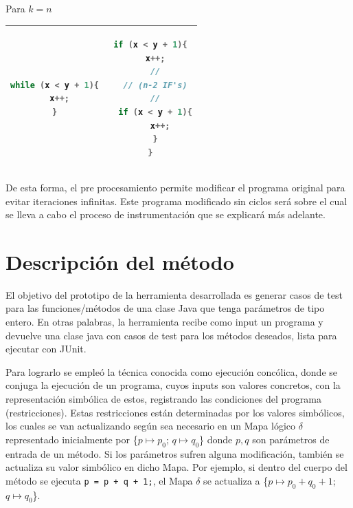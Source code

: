 \documentclass{llncs}
\begin{document}
Para \(k = n\)
\begin{table}
\centering
\begin{tabular}{|c | c|}
\hline
\begin{lstlisting}[language=Java]
while (x < y + 1){
  x++;
}
\end{lstlisting} & 
\begin{lstlisting}[language=Java]
if (x < y + 1){
  x++;
  //
  // (n-2 IF's)
  //
  if (x < y + 1){
    x++;
  }
}
\end{lstlisting}\\
\hline
\end{tabular}
\end{table}

De esta forma, el pre procesamiento permite modificar el programa original para evitar iteraciones infinitas.
Este programa modificado sin ciclos será sobre el cual se lleva a cabo el proceso de instrumentación que se explicará más adelante.


\section{Descripción del método}
El objetivo del prototipo de la herramienta desarrollada es generar casos de test para las funciones/métodos de una clase Java que tenga parámetros de tipo
entero. En otras palabras, la herramienta recibe como input un programa y devuelve una clase java con casos de test para los métodos deseados, lista para ejecutar con JUnit.

Para lograrlo se empleó la técnica conocida como ejecución concólica, donde se conjuga la ejecución de un programa, cuyos inputs son valores concretos,
con la representación simbólica de estos, registrando las condiciones del programa (restricciones). Estas restricciones están determinadas por los valores simbólicos,
los cuales se van actualizando según sea necesario en un Mapa lógico $\delta$ representado inicialmente por \{$p \mapsto p_0$; $q \mapsto q_0$\}
donde $p,q$ son parámetros de entrada de un método. Si los parámetros sufren alguna modificación, también se actualiza su valor simbólico en dicho Mapa.
Por ejemplo, si dentro del cuerpo del método se ejecuta \texttt{p = p + q + 1;}, el Mapa $\delta$ se actualiza a \{$p \mapsto p_0 + q_0 + 1$; $q \mapsto q_0$\}.
\end{document}
